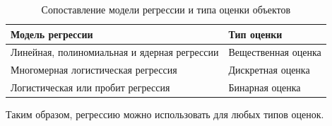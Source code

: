 \begin{table}[h]
\centering
\caption{\centering Сопоставление модели регрессии и типа оценки объектов}
\begin{tabular}{|l|l|}
\hline
\textbf{Модель регрессии} & \textbf{Тип оценки} \\
\hline
Линейная, полиномиальная и ядерная регрессии & Вещественная оценка \\
\hline
Многомерная логистическая регрессия & Дискретная оценка \\
\hline
Логистическая или пробит регрессия & Бинарная оценка \\
\hline
\end{tabular}
\label{tab:models}
\end{table}
Таким образом, регрессию можно использовать для любых типов оценок.

